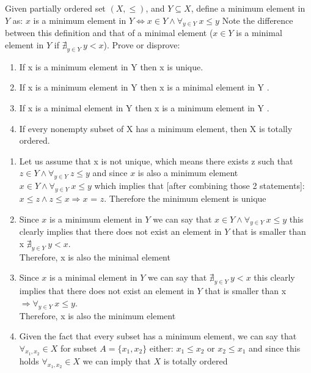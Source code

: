\documentclass[12pt]{article}
\newenvironment{solution}[2][Solution]{ \begin{trivlist}
\item[\hskip \labelsep {\bfseries #1}]}{\end{trivlist}}
\newenvironment{problem}[2][Problem]{\begin{trivlist}
\item[\hskip \labelsep {\bfseries #1}\hskip \labelsep {\bfseries #2.}]}{\end{trivlist}}
\begin{document}
\begin{problem}{11}Given partially ordered set $(X,\le)$, and $Y \subseteq X$, define a minimum element in $Y$ as: 
\vskip 0.1in
$x$ is a minimum element in $Y \Leftrightarrow x \in Y \wedge \forall_{y \in Y}\ x \le y$
\vskip 0.1in
Note the difference between this definition and that of a minimal element ($x \in Y$ is a minimal element in $Y$ if  $\nexists_{y \in Y}\ y < x$). Prove or disprove:
\item[]
\begin{enumerate}[label=\alph*)]
    \item If x is a minimum element in Y then x is unique.
    \item If x is a minimum element in Y then x is a minimal element in Y .
    \item If x is a minimal element in Y then x is a minimum element in Y .
    \item If every nonempty subset of X has a minimum element, then X is totally ordered.
\end{enumerate}
\end{problem}
\begin{solution}{11}
\item[]
\begin{enumerate}[label=\alph*)]
    \item Let us assume that x is not unique, which means there exists z such that $z \in Y \wedge  \forall_{y \in Y}\ z \le y$ and since $x$ is also a minimum element $x \in Y \wedge \forall_{y \in Y}\ x \le y$ which implies that [after combining those 2 statements]: $x \le z \wedge z \le x \Rightarrow x$ = $z$. Therefore the minimum element is unique
    \item Since $x$ is a minimum element in $Y$ we can say that $ x \in Y \wedge \forall_{y \in Y}\ x \le y$ this clearly implies that there does not exist an element in $Y$ that is smaller than x $\nexists_{y \in Y}\ y < x$.\\ Therefore, x is also the minimal element
    \item Since $x$ is a minimal element in $Y$ we can say that $\nexists_{y \in Y}\ y < x$  this clearly implies that there does not exist an element in $Y$ that is smaller than x $ \Rightarrow \forall_{y \in Y}\ x \le y$.\\ Therefore, x is also the minimum element
    \item Given the fact that every subset has a minimum element, we can say that $\forall_{x_1,x_2} \in X$ for subset $A = \{x_1, x_2\}$ either: $x_1 \leq x_2$ or $x_2 \leq x_1$ and since this holds $\forall_{x_1,x_2} \in X$ we can imply that $X$ is totally ordered
\end{enumerate}
\end{solution}
\end{document}
